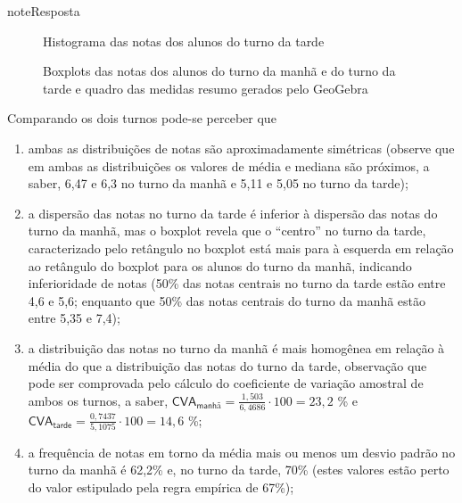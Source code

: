 \begin{sphinxadmonition}{note}{Resposta}
\begin{figure}[H]
\centering
\capstart

\noindent{}
\caption{Histograma das notas dos alunos do turno da tarde}\label{\detokenize{PE104-E:id1}}\label{\detokenize{PE104-E:id13}}\end{figure}

\begin{figure}[H]
\centering
\capstart

\noindent{}
\caption{Boxplots das notas dos alunos do turno da manhã e do turno da tarde e quadro das medidas resumo gerados pelo GeoGebra}\label{\detokenize{PE104-E:id2}}\label{\detokenize{PE104-E:id14}}\end{figure}

Comparando os dois turnos pode-se perceber que
\begin{enumerate}
\item {} 
ambas as distribuições de notas são aproximadamente simétricas (observe que em ambas as distribuições os valores de média e mediana são próximos, a saber, 6,47  e 6,3 no turno da manhã e 5,11 e 5,05 no turno da tarde);

\item {} 
a dispersão das notas no turno da tarde é inferior à dispersão das notas do turno da manhã, mas o boxplot revela que o “centro” no turno da tarde, caracterizado pelo retângulo no boxplot está mais para à esquerda em relação ao retângulo do boxplot para os alunos do turno da manhã, indicando  inferioridade de notas (50\% das notas centrais no turno da tarde estão entre 4,6 e 5,6; enquanto que 50\% das notas centrais do turno da manhã estão entre 5,35 e 7,4);

\item {} 
a distribuição das notas no turno da manhã é mais homogênea em relação à média do que a distribuição das notas do turno da tarde, observação que pode ser comprovada pelo cálculo do coeficiente de variação amostral de ambos os turnos, a saber, \(\textsf{CVA}_{\textsf{manhã}}=\frac{1,503}{6,4686}\cdot 100=23,2\) \% e \(\textsf{CVA}_{\textsf{tarde}}=\frac{0,7437}{5,1075}\cdot 100=14,6\) \%;

\item {} 
a frequência de notas em torno da média mais ou menos um desvio padrão no turno da manhã é 62,2\% e, no turno da tarde, 70\% (estes valores estão perto do valor estipulado pela regra empírica de 67\%);


\end{enumerate}
\end{sphinxadmonition}
